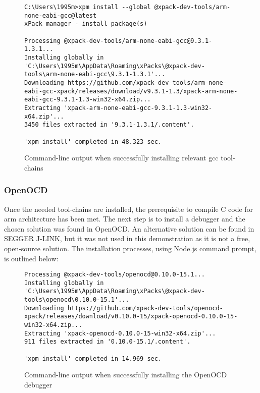 \begin{figure}[H]
\begin{center}
\begin{lstlisting}[style=DOS]
C:\Users\1995m>xpm install --global @xpack-dev-tools/arm-none-eabi-gcc@latest
xPack manager - install package(s)

Processing @xpack-dev-tools/arm-none-eabi-gcc@9.3.1-1.3.1...
Installing globally in 'C:\Users\1995m\AppData\Roaming\xPacks\@xpack-dev-tools\arm-none-eabi-gcc\9.3.1-1.3.1'...
Downloading https://github.com/xpack-dev-tools/arm-none-eabi-gcc-xpack/releases/download/v9.3.1-1.3/xpack-arm-none-eabi-gcc-9.3.1-1.3-win32-x64.zip...
Extracting 'xpack-arm-none-eabi-gcc-9.3.1-1.3-win32-x64.zip'...
3450 files extracted in '9.3.1-1.3.1/.content'.

'xpm install' completed in 48.323 sec.
\end{lstlisting}
\caption{Command-line output when successfully installing relevant gcc tool-chains}
\label{fig:cmd4}
\end{center}
\end{figure}

\subsubsection{OpenOCD}
\label{OpenOCD}
Once the needed tool-chains are installed, the prerequisite to compile C code for arm architecture has been met. The next step is to install a debugger and the chosen solution was found in OpenOCD. An alternative solution can be found in SEGGER J-LINK, but it was not used in this demonstration as it is not a free, open-source solution. The installation processes, using Node\hyperref[listExt]{.js} command prompt, is outlined below:
\begin{figure}[H]
\begin{center}
\begin{lstlisting}[style=DOS]
Processing @xpack-dev-tools/openocd@0.10.0-15.1...
Installing globally in 'C:\Users\1995m\AppData\Roaming\xPacks\@xpack-dev-tools\openocd\0.10.0-15.1'...
Downloading https://github.com/xpack-dev-tools/openocd-xpack/releases/download/v0.10.0-15/xpack-openocd-0.10.0-15-win32-x64.zip...
Extracting 'xpack-openocd-0.10.0-15-win32-x64.zip'...
911 files extracted in '0.10.0-15.1/.content'.

'xpm install' completed in 14.969 sec.
\end{lstlisting}
\caption{Command-line output when successfully installing the OpenOCD debugger}
\label{fig:cmd5}
\end{center}
\end{figure}

